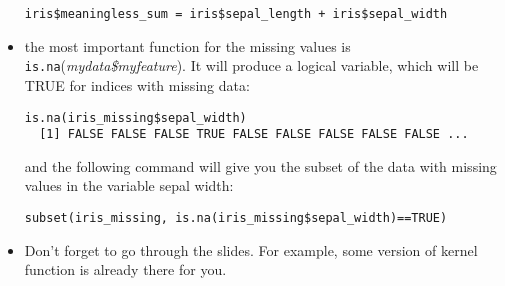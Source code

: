 \documentclass{article}
\begin{document}
\begin{itemize}
\begin{lstlisting}
iris$meaningless_sum = iris$sepal_length + iris$sepal_width
\end{lstlisting}
\item the most important function for the missing values is   \texttt{is.na}(\emph{mydata\$myfeature}). It will produce a logical variable, which will be TRUE for indices with missing data:
\begin{lstlisting}
is.na(iris_missing$sepal_width)
  [1] FALSE FALSE FALSE TRUE FALSE FALSE FALSE FALSE FALSE ...
\end{lstlisting}
and the following command will give you the subset of the data with missing values in the variable sepal width:
\begin{lstlisting}
subset(iris_missing, is.na(iris_missing$sepal_width)==TRUE)
\end{lstlisting}
\item Don't forget to go through the slides. For example, some version of kernel function is already there for you. 
\end{itemize}
\end{document}
